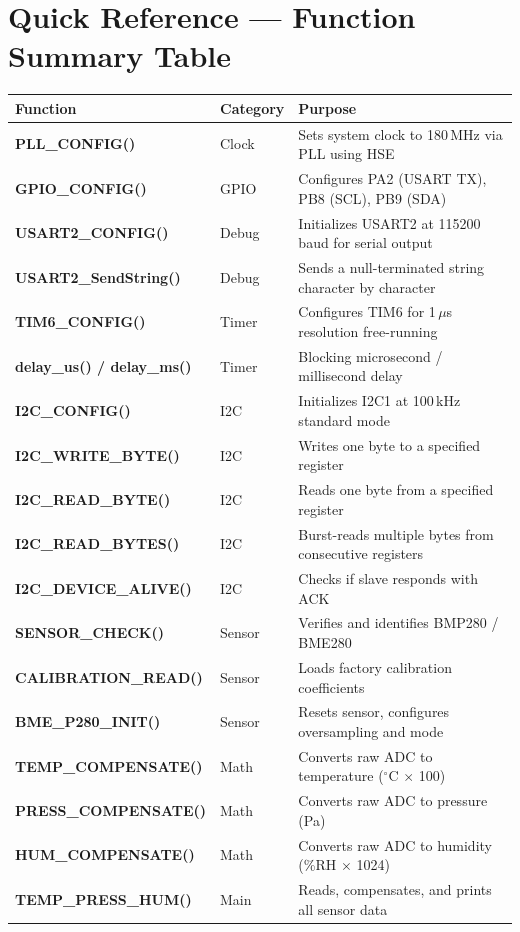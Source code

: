 \documentclass[12pt, a4paper]{article}
\begin{document}
\section{Quick Reference --- Function Summary Table}

\begin{center}
\renewcommand{\arraystretch}{1.4}
\small
\begin{tabularx}{\textwidth}{>{\ttfamily\bfseries\color{deepblue}\arraybackslash}p{4.2cm} >{\centering\arraybackslash}p{2.5cm} X}
\toprule
\rowcolor{accentblue!20}
\textbf{Function} & \textbf{Category} & \textbf{Purpose} \\
\midrule
PLL\_CONFIG() & Clock & Sets system clock to 180\,MHz via PLL using HSE \\
\rowcolor{gray!5}
GPIO\_CONFIG() & GPIO & Configures PA2 (USART TX), PB8 (SCL), PB9 (SDA) \\
USART2\_CONFIG() & Debug & Initializes USART2 at 115200 baud for serial output \\
\rowcolor{gray!5}
USART2\_SendString() & Debug & Sends a null-terminated string character by character \\
TIM6\_CONFIG() & Timer & Configures TIM6 for 1\,$\mu$s resolution free-running \\
\rowcolor{gray!5}
delay\_us() / delay\_ms() & Timer & Blocking microsecond / millisecond delay \\
I2C\_CONFIG() & I2C & Initializes I2C1 at 100\,kHz standard mode \\
\rowcolor{gray!5}
I2C\_WRITE\_BYTE() & I2C & Writes one byte to a specified register \\
I2C\_READ\_BYTE() & I2C & Reads one byte from a specified register \\
\rowcolor{gray!5}
I2C\_READ\_BYTES() & I2C & Burst-reads multiple bytes from consecutive registers \\
I2C\_DEVICE\_ALIVE() & I2C & Checks if slave responds with ACK \\
\rowcolor{gray!5}
SENSOR\_CHECK() & Sensor & Verifies and identifies BMP280 / BME280 \\
CALIBRATION\_READ() & Sensor & Loads factory calibration coefficients \\
\rowcolor{gray!5}
BME\_P280\_INIT() & Sensor & Resets sensor, configures oversampling and mode \\
TEMP\_COMPENSATE() & Math & Converts raw ADC to temperature ($^\circ$C $\times$ 100) \\
\rowcolor{gray!5}
PRESS\_COMPENSATE() & Math & Converts raw ADC to pressure (Pa) \\
HUM\_COMPENSATE() & Math & Converts raw ADC to humidity (\%RH $\times$ 1024) \\
\rowcolor{gray!5}
TEMP\_PRESS\_HUM() & Main & Reads, compensates, and prints all sensor data \\
\bottomrule
\end{tabularx}
\end{center}
\end{document}
